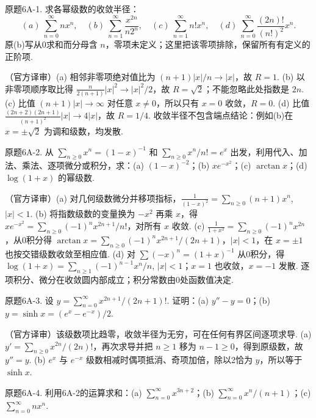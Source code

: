 \begin{exercise}\label{cw:bank-6A-1}原题6A-1. 求各幂级数的收敛半径：
\[(a)\ \sum_{n=0}^\infty nx^n,\quad (b)\ \sum_{n=1}^\infty\frac{x^{2n}}{n2^n},\quad
(c)\ \sum_{n=1}^\infty n!x^n,\quad (d)\ \sum_{n=0}^\infty\frac{(2n)!}{(n!)^2}x^n.\]
原(b)写从0求和而分母含 $n$，零项未定义；这里把该零项排除，保留所有有定义的正阶项.
\end{exercise}
\begin{solution}（官方译审）(a) 相邻非零项绝对值比为 $(n+1)|x|/n\to|x|$，故 $R=1$. (b) 以非零项顺序取比得 $\frac{n}{2(n+1)}|x|^2\to|x|^2/2$，故 $R=\sqrt2$；不能忽略此处指数是 $2n$. (c) 比值 $(n+1)|x|\to\infty$ 对任意 $x\ne0$，所以只有 $x=0$ 收敛，$R=0$. (d) 比值 $\frac{(2n+2)(2n+1)}{(n+1)^2}|x|\to4|x|$，故 $R=1/4$. 收敛半径不包含端点结论：例如(b)在 $x=\pm\sqrt2$ 为调和级数，均发散.\end{solution}
\begin{exercise}\label{cw:bank-6A-2}原题6A-2. 从 $\sum_{n\ge0}x^n=(1-x)^{-1}$ 和 $\sum_{n\ge0}x^n/n!=e^x$ 出发，利用代入、加法、乘法、逐项微分或积分，求：(a) $(1-x)^{-2}$；(b) $xe^{-x^2}$；(c) $\arctan x$；(d) $\log(1+x)$ 的幂级数.\end{exercise}
\begin{solution}（官方译审）(a) 对几何级数微分并移项指标，$\frac1{(1-x)^2}=\sum_{n\ge0}(n+1)x^n$, $|x|<1$. (b) 将指数级数的变量换为 $-x^2$ 再乘 $x$，得 $xe^{-x^2}=\sum_{n\ge0}(-1)^nx^{2n+1}/n!$，对所有 $x$ 收敛. (c) $\frac1{1+x^2}=\sum_{n\ge0}(-1)^nx^{2n}$，从0积分得 $\arctan x=\sum_{n\ge0}(-1)^nx^{2n+1}/(2n+1)$，$|x|<1$，在 $x=\pm1$ 也按交错级数收敛至相应值. (d) 对 $\sum(-x)^n=(1+x)^{-1}$ 从0积分，得 $\log(1+x)=\sum_{n\ge1}(-1)^{n-1}x^n/n$, $|x|<1$；$x=1$ 也收敛，$x=-1$ 发散. 逐项积分、微分在收敛圆内部成立；积分常数由0处函数值决定.\end{solution}
\begin{exercise}\label{cw:bank-6A-3}原题6A-3. 设 $y=\sum_{n=0}^\infty x^{2n+1}/(2n+1)!$. 证明：(a) $y''-y=0$；(b) $y=\sinh x=(e^x-e^{-x})/2$.\end{exercise}
\begin{solution}（官方译审）该级数项比趋零，收敛半径为无穷，可在任何有界区间逐项求导. (a) $y'=\sum_{n\ge0}x^{2n}/(2n)!$，再次求导并把 $n\ge1$ 移为 $n-1\ge0$，得到原级数，故 $y''=y$. (b) $e^x$ 与 $e^{-x}$ 级数相减时偶项抵消、奇项加倍，除以2恰为 $y$，所以等于 $\sinh x$.\end{solution}
\begin{exercise}\label{cw:bank-6A-4}原题6A-4. 利用6A-2的运算求和：(a) $\sum_{n=0}^\infty x^{3n+2}$；(b) $\sum_{n=0}^\infty x^n/(n+1)$；(c) $\sum_{n=0}^\infty nx^n$.\end{exercise}
